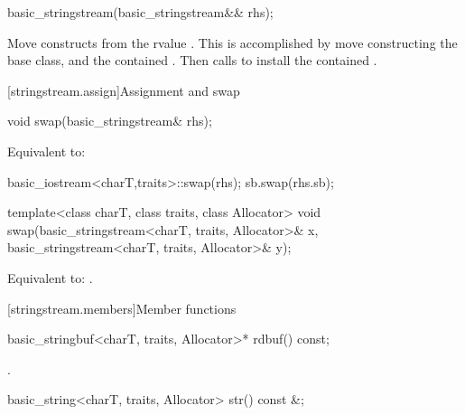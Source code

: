 %
\begin{itemdecl}
basic_stringstream(basic_stringstream&& rhs);
\end{itemdecl}

\begin{itemdescr}
\pnum
\effects
Move constructs from the rvalue . This
is accomplished by move constructing the base class, and the contained
.
Then calls 
to install the contained .
\end{itemdescr}

[stringstream.assign]{Assignment and swap}

%
\begin{itemdecl}
void swap(basic_stringstream& rhs);
\end{itemdecl}

\begin{itemdescr}
\pnum
\effects
Equivalent to:
\begin{codeblock}
basic_iostream<charT,traits>::swap(rhs);
sb.swap(rhs.sb);
\end{codeblock}
\end{itemdescr}

%
\begin{itemdecl}
template<class charT, class traits, class Allocator>
  void swap(basic_stringstream<charT, traits, Allocator>& x,
            basic_stringstream<charT, traits, Allocator>& y);
\end{itemdecl}

\begin{itemdescr}
\pnum
\effects
Equivalent to: .
\end{itemdescr}

[stringstream.members]{Member functions}

%
\begin{itemdecl}
basic_stringbuf<charT, traits, Allocator>* rdbuf() const;
\end{itemdecl}

\begin{itemdescr}
\pnum
\returns
{}.
\end{itemdescr}

%
\begin{itemdecl}
basic_string<charT, traits, Allocator> str() const &;
\end{itemdecl}

